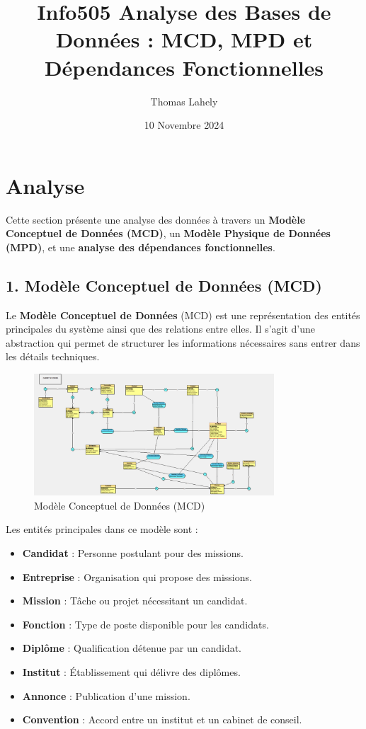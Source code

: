 \documentclass[a4paper,12pt]{article}
\title{Info505 Analyse des Bases de Données : MCD, MPD et Dépendances Fonctionnelles}
\author{Thomas Lahely }
\date{10 Novembre 2024}
\begin{document}
\maketitle

\section*{Analyse}

Cette section présente une analyse des données à travers un \textbf{Modèle Conceptuel de Données (MCD)}, un \textbf{Modèle Physique de Données (MPD)}, et une \textbf{analyse des dépendances fonctionnelles}.

\subsection*{1. Modèle Conceptuel de Données (MCD)}

Le \textbf{Modèle Conceptuel de Données} (MCD) est une représentation des entités principales du système ainsi que des relations entre elles. Il s'agit d'une abstraction qui permet de structurer les informations nécessaires sans entrer dans les détails techniques. 

\begin{figure}[h!]
    \centering
    \includegraphics[width=0.8\textwidth]{MCD.png} 
    \caption{Modèle Conceptuel de Données (MCD)}
    \label{fig:mcd}
\end{figure}

\noindent
Les entités principales dans ce modèle sont :
\begin{itemize}
    \item \textbf{Candidat} : Personne postulant pour des missions.
    \item \textbf{Entreprise} : Organisation qui propose des missions.
    \item \textbf{Mission} : Tâche ou projet nécessitant un candidat.
    \item \textbf{Fonction} : Type de poste disponible pour les candidats.
    \item \textbf{Diplôme} : Qualification détenue par un candidat.
    \item \textbf{Institut} : Établissement qui délivre des diplômes.
    \item \textbf{Annonce} : Publication d'une mission.
    \item \textbf{Convention} : Accord entre un institut et un cabinet de conseil.
\end{itemize}
\end{document}
